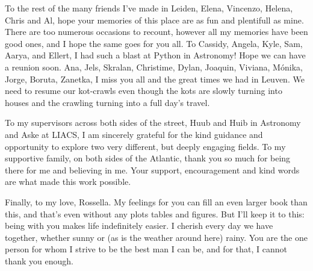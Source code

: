 \begin{thesisacknowledgements}
\begin{changemargin}{-0.3cm}{-0.3cm}
{    To the rest of the many friends I've made in Leiden, Elena, Vincenzo, Helena, Chris and Al, hope your memories of this place are as fun and plentifull as mine. There are too numerous occasions to recount, however all my memories have been good ones, and I hope the same goes for you all. To Cassidy, Angela, Kyle, Sam, Aarya, and Ellert, I had such a blast at Python in Astronomy! Hope we can have a reunion soon. Ana, Jels, Skralan, Christime, Dylan, Joaquin, Viviana, M{\'o}nika, Jorge, Boruta, Zanetka, I miss you all and the great times we had in Leuven. We need to resume our kot-crawls even though the kots are slowly turning into houses and the crawling turning into a full day's travel. 

    To my supervisors across both sides of the street, Huub and Huib in Astronomy and Aske at LIACS, I am sincerely grateful for the kind guidance and opportunity to explore two very different, but deeply engaging fields. To my supportive family, on both sides of the Atlantic, thank you so much for being there for me and believing in me. Your support, encouragement and kind words are what made this work possible. 

    Finally, to my love, Rossella. My feelings for you can fill an even larger book than this, and that's even without any plots tables and figures. But I'll keep it to this: being with you makes life indefinitely easier. I cherish every day we have together, whether sunny or (as is the weather around here) rainy. You are the one person for whom I strive to be the best man I can be, and for that, I cannot thank you enough.  }
\end{changemargin}

\end{thesisacknowledgements}

